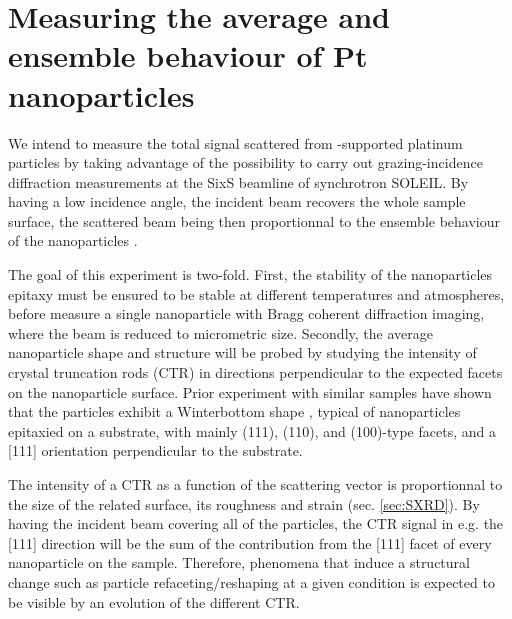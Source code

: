 \section{Measuring the average and ensemble behaviour of Pt nanoparticles}


We intend to measure the total signal scattered from -supported platinum particles by taking advantage of the possibility to carry out grazing-incidence diffraction measurements at the SixS beamline of synchrotron SOLEIL.
By having a low incidence angle, the incident beam recovers the whole sample surface, the scattered beam being then proportionnal to the ensemble behaviour of the nanoparticles \parencite{Nolte2008, Hejral2013}.

The goal of this experiment is two-fold.
First, the stability of the nanoparticles epitaxy must be ensured to be stable at different temperatures and atmospheres, before measure a single nanoparticle with Bragg coherent diffraction imaging, where the beam is reduced to micrometric size.
Secondly, the average nanoparticle shape and structure will be probed by studying the intensity of crystal truncation rods (CTR) in directions perpendicular to the expected facets on the nanoparticle surface.
Prior experiment with similar samples \parencite{Dupraz2017, Li2020, Lim2021, Dupraz2022} have shown that the particles exhibit a Winterbottom shape \parencite{WINTERBOTTOM1967, Boukouvala2021}, typical of nanoparticles epitaxied on a substrate, with mainly (111), (110), and (100)-type facets, and a [111] orientation perpendicular to the substrate.

The intensity of a CTR as a function of the scattering vector is proportionnal to the size of the related surface, its roughness and strain (sec. \ref{sec:SXRD}).
By having the incident beam covering all of the particles, the CTR signal in e.g. the [111] direction will be the sum of the contribution from the [111] facet of every nanoparticle on the sample.
Therefore, phenomena that induce a structural change such as particle refaceting/reshaping at a given condition is expected to be visible by an evolution of the different CTR.


